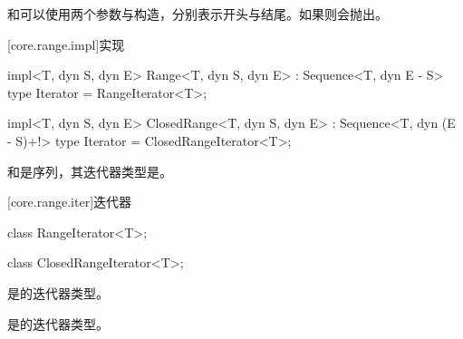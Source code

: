 \pnum
{}和可以使用两个参数与构造，分别表示开头与结尾。如果则会抛出。

[core.range.impl]{实现}

\begin{itemdecl}
impl<T, dyn S, dyn E> Range<T, dyn S, dyn E> : Sequence<T, dyn E - S> {
    type Iterator = RangeIterator<T>;
}
\end{itemdecl}

\begin{itemdecl}
impl<T, dyn S, dyn E> ClosedRange<T, dyn S, dyn E> : Sequence<T, dyn (E - S)+!> {
    type Iterator = ClosedRangeIterator<T>;
}
\end{itemdecl}

\pnum
{}和是序列，其迭代器类型是。

[core.range.iter]{迭代器}

\begin{itemdecl}
class RangeIterator<T>;
\end{itemdecl}

\begin{itemdecl}
class ClosedRangeIterator<T>;
\end{itemdecl}

\pnum
{}是的迭代器类型。

\pnum
{}是的迭代器类型。